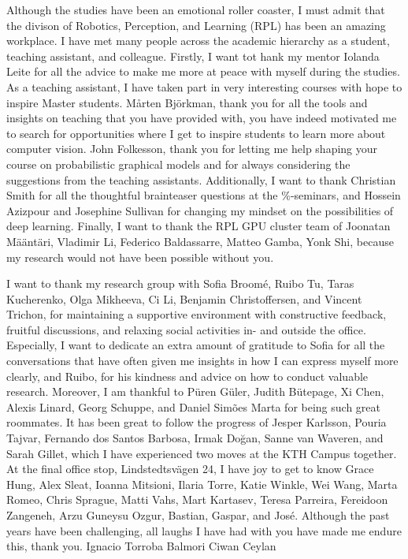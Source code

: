  
\noindent Although the studies have been an emotional roller coaster, I must admit that the divison of Robotics, Perception, and Learning (RPL) has been an amazing workplace. I have met many people across the academic hierarchy as a student, teaching assistant, and colleague. Firstly, I want tot hank my mentor Iolanda Leite for all the advice to make me more at peace with myself during the studies. As a teaching assistant, I have taken part in very interesting courses with hope to inspire Master students. Mårten Björkman, thank you for all the tools and insights on teaching that you have provided with, you have indeed motivated me to search for opportunities where I get to inspire students to learn more about computer vision. John Folkesson, thank you for letting me help shaping your course on probabilistic graphical models and for always considering the suggestions from the teaching assistants. Additionally, I want to thank Christian Smith for all the thoughtful brainteaser questions at the \%-seminars, and Hossein Azizpour and Josephine Sullivan for changing my mindset on the possibilities of deep learning. Finally, I want to thank the RPL GPU cluster team of Joonatan Määntäri, Vladimir Li, Federico Baldassarre, Matteo Gamba, Yonk Shi, because my research would not have been possible without you.  
\newline 

\noindent I want to thank my research group with Sofia Broomé, Ruibo Tu, Taras Kucherenko, Olga Mikheeva, Ci Li, Benjamin Christoffersen, and Vincent Trichon, for maintaining a supportive environment with constructive feedback, fruitful discussions, and relaxing social activities in- and outside the office. Especially, I want to dedicate an extra amount of gratitude to Sofia for all the conversations that have often given me insights in how I can express myself more clearly, and Ruibo, for his kindness and advice on how to conduct valuable research.   
Moreover, I am thankful to P\"{u}ren  G\"{u}ler, Judith B\"{u}tepage, Xi Chen, Alexis Linard, Georg Schuppe, and Daniel Sim\~{o}es Marta for being such great roommates. 
It has been great to follow the progress of Jesper Karlsson, Pouria Tajvar, Fernando dos Santos Barbosa, Irmak Do\u{g}an, Sanne van Waveren, and Sarah Gillet, which I have experienced two moves at the KTH Campus together. At the final office stop, Lindstedtsvägen 24, I have joy to get to know Grace Hung, Alex Sleat, Ioanna Mitsioni, Ilaria Torre, Katie Winkle, Wei Wang, Marta Romeo, Chris Sprague, Matti Vahs, Mart Kartasev, Teresa Parreira, Fereidoon Zangeneh, Arzu Guneysu Ozgur, Bastian, Gaspar, and José. Although the past years have been challenging, all laughs I have had with you have made me endure this, thank you. 
Ignacio Torroba Balmori 
Ciwan Ceylan
\newline 

